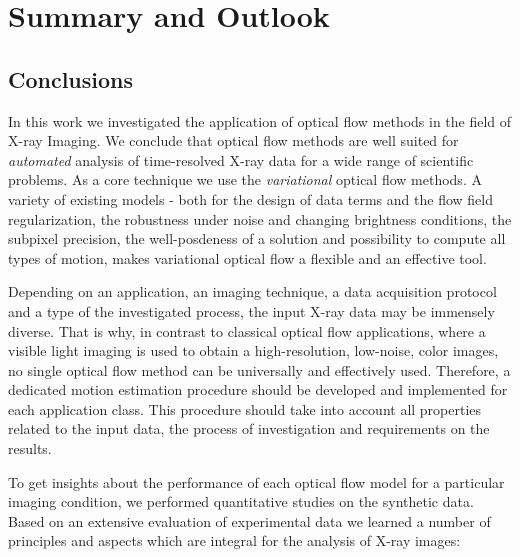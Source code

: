 \chapter {Summary and Outlook}

\section{Conclusions}
\label{conclusions}

In this work we investigated the application of optical flow methods in the field of X-ray Imaging. We conclude that optical flow methods are well suited for \textit{automated} analysis of time-resolved X-ray data for a wide range of scientific problems. As a core technique we use the \textit{variational} optical flow methods. A variety of existing models - both for the design of data terms and the flow field regularization, the robustness under noise and changing brightness conditions, the subpixel precision, the well-posdeness of a solution and possibility to compute all types of motion, makes variational optical flow a flexible and an effective tool. 

Depending on an application, an imaging technique, a data acquisition protocol and a type of the investigated process, the input X-ray data may be immensely diverse. That is why, in contrast to classical optical flow applications, where a visible light imaging is used to obtain a high-resolution, low-noise, color images, no single optical flow method can be universally and effectively used. Therefore, a dedicated motion estimation procedure should be developed and implemented  for each application class. This procedure should take into account all properties related to the input data, the process of investigation and requirements on the results.   

To get insights about the performance of each optical flow model for a particular imaging condition, we performed  quantitative studies on the synthetic data.  Based on an extensive evaluation of experimental data we learned a number of principles and aspects which are integral for the analysis of X-ray images:

